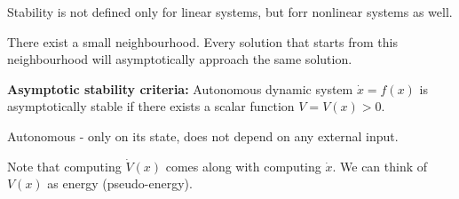 Stability is not defined only for linear systems, but forr nonlinear systems as well.

There exist a small neighbourhood. Every solution that starts from this neighbourhood will asymptotically approach the same solution. 

\textbf{Asymptotic stability criteria:}
Autonomous dynamic system $\dot x = f(x)$ is asymptotically stable if there exists a scalar function $V = V(x) > 0$. 

Autonomous - only on its state, does not depend on any external input. 

Note that computing $\dot V(x)$ comes along with computing $\dot x$. 
We can think of $V(x)$ as energy (pseudo-energy).